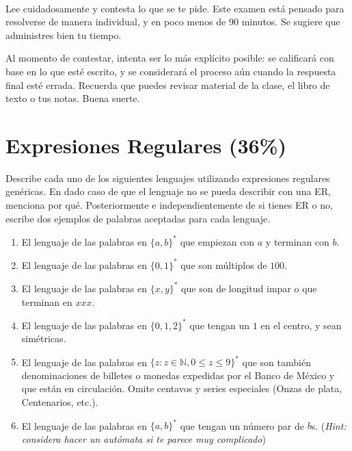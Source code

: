 \documentclass[8pt, onside]{article}
\title{
    \myclass \\
    \textbf{\mytitle} \\
    \myheader
    \date{}
}
\begin{document}
\maketitle

\vspace{-1.5cm}

Lee cuidadosamente y contesta lo que se te pide.
Este examen está pensado para resolverse de manera individual, y en poco menos de 90 minutos.
Se sugiere que administres bien tu tiempo.

Al momento de contestar, intenta ser lo más explícito posible: se calificará con base en lo que esté escrito, y se considerará el proceso aún cuando la respuesta final esté errada.
Recuerda que puedes revisar material de la clase, el libro de texto o tus notas.
Buena suerte.

\section{Expresiones Regulares (36\%)}

Describe cada uno de los siguientes lenguajes utilizando expresiones regulares genéricas. En dado caso de que el lenguaje no se pueda describir con una ER, menciona por qué. Posteriormente e independientemente de si tienes ER o no, escribe dos ejemplos de palabras aceptadas para cada lenguaje.

\begin{enumerate}[label=\tt \alph*)]
    \itemsep0em
    \item El lenguaje de las palabras en $\{a,b\}^*$ que empiezan con $a$ y terminan con $b$.
    \item El lenguaje de las palabras en $\{0,1\}^*$ que son múltiplos de $100$.
    \item El lenguaje de las palabras en $\{x, y\}^*$ que son de longitud impar o que terminan en $xxx$.
    \item El lenguaje de las palabras en $\{0,1,2\}^*$ que tengan un $1$ en el centro, y sean simétricas.
    \item El lenguaje de las palabras en $\{z : z \in \mathbb{N}, 0 \leq z \leq 9\}^*$ que son también denominaciones de billetes o monedas expedidas por el Banco de México y que están en circulación. Omite centavos y series especiales (Onzas de plata, Centenarios, etc.).
    \item El lenguaje de las palabras en $\{a,b\}^*$ que tengan un número par de $b$s. (\textit{Hint: considera hacer un autómata si te parece muy complicado})
\end{enumerate}
\end{document}
